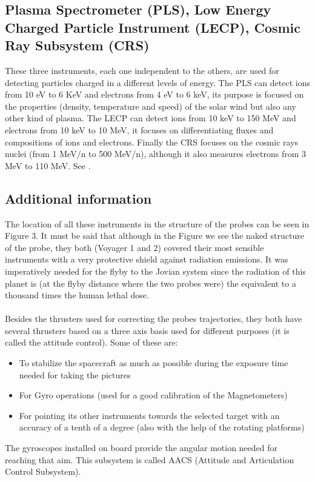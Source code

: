 \documentclass[11pt,a4paper]{article}
\begin{document}
\subsection{Plasma Spectrometer (PLS), Low Energy Charged Particle Instrument (LECP), Cosmic Ray Subsystem (CRS)}
These three instruments, each one independent to the others, are used for detecting particles charged in a different levels of energy. The PLS can detect ions from 10 eV to 6 KeV and electrons from 4 eV to 6 keV, its purpose is focused on the properties (density, temperature and speed) of the solar wind but also any other kind of plasma. The LECP can detect ions from 10 keV to 150 MeV and electrons from 10 keV to 10 MeV, it focuses on differentiating fluxes and compositions of ions and electrons. Finally the CRS focuses on the cosmic rays nuclei (from 1 MeV/n to 500 MeV/n), although it also measures electrons from 3 MeV to 110 MeV. See \cite{PLS,LECP,CRS}.

\subsection{Additional information}
The location of all these instruments in the structure of the probes can be seen in Figure 3. It must be said that although in the Figure we see the naked structure of the probe, they both (Voyager 1 and 2) covered their most sensible instruments with a very protective shield against radiation emissions. It was imperatively needed for the flyby to the Jovian system since the radiation of this planet is (at the flyby distance where the two probes were) the equivalent to a thousand times the human lethal dose. 
\\\\
Besides the thrusters used for correcting the probes trajectories, they both have several thrusters based on a three axis basis used for different purposes (it is called the attitude control). Some of these are:
\begin{itemize}
\item To stabilize the spacecraft as much as possible during the exposure time needed for taking the pictures
\item For Gyro operations (used for a good calibration of the Magnetometers)
\item For pointing its other instruments towards the selected target with an accuracy of a tenth of a degree (also with the help of the rotating platforms)
\end{itemize}
The gyroscopes installed on board provide the angular motion needed for reaching that aim. This subsystem is called AACS (Attitude and Articulation Control Subsystem).
\end{document}

